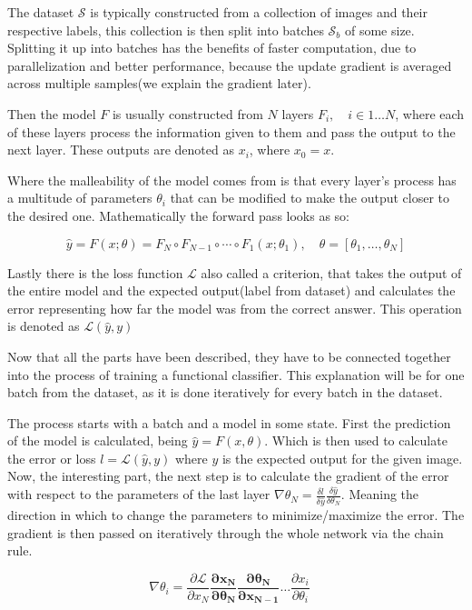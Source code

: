 \documentclass[oneside]{ctuthesis}
\begin{document}
The dataset $\mathcal{S}$ is typically constructed from a collection of images and their respective labels, this collection is then split into batches $\mathcal{S}_b$ of some size. Splitting it up into batches has the benefits of faster computation, due to parallelization and better performance, because the update gradient is averaged across multiple samples(we explain the gradient later). 

Then the model $F$ is usually constructed from $N$ layers $F_i, \quad i\in1\dots N$, where each of these layers process the information given to them and pass the output to the next layer. These outputs are denoted as $x_i$, where $x_0 = x$.

Where the malleability of the model comes from is that every layer's process has a multitude of parameters $\theta_i$ that can be modified to make the output closer to the desired one. Mathematically the forward pass looks as so:

\[ 
    \hat{y} = F(x;\theta) = F_N \circ F_{N-1} \circ \cdots \circ F_1(x;\theta_1) ,\quad
    \theta = [\theta_1, \ldots, \theta_N]
\] 

Lastly there is the loss function $\mathcal{L}$ also called a criterion, that takes the output of the entire model and the expected output(label from dataset) and calculates the error representing how far  the model was from the correct answer. This operation is denoted as $\mathcal{L}(\hat{y}, y)$


Now that all the parts have been described, they have to be connected together into the process of training a functional classifier. This explanation will be for one batch from the dataset, as it is done iteratively for every batch in the dataset. 

The process starts with a batch and a model in some state. 
First the prediction of the model is calculated, being $\hat{y} = F(x, \theta)$. 
Which is then used to calculate the error or loss $l=\mathcal{L}(\hat{y}, y)$  where $y$ is the expected output for the given image.
Now, the interesting part, the next step is to calculate the gradient of the error with respect to the parameters of the last layer $\nabla\theta_N = \frac{\delta l}{\delta \hat{y}}\frac{\delta \hat{y}}{\delta \theta_N}$.
Meaning the direction in which to change the parameters to minimize/maximize the error. 
The gradient is then passed on iteratively through the whole network via the chain rule.

\[ 
    \nabla\theta_i = 
        \frac{\partial \mathcal{L}}{\partial x_N} 
        \boldsymbol{
            \frac{\partial x_N}{\partial \theta_N}
            \frac{\partial \theta_N}{\partial x_{N-1}}} \dots
        \frac{\partial x_i}{\partial \theta_i}\quad
\]
\end{document}
